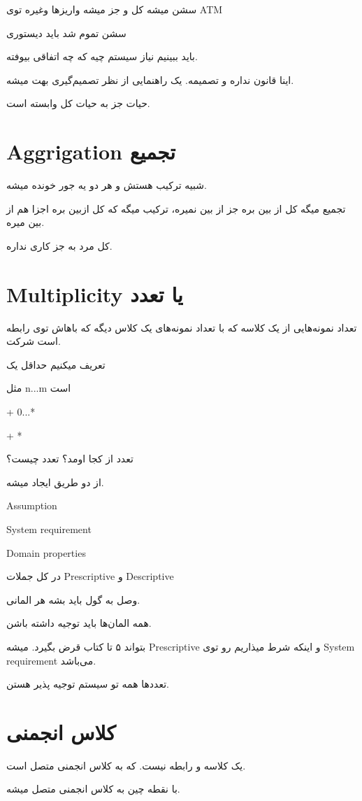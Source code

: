 سشن میشه کل و جز میشه واریزها وغیره توی ATM

سشن تموم شد باید دیستوری

باید ببینیم نیاز سیستم چیه که چه اتفاقی بیوفته.

اینا قانون نداره و تصمیمه. یک راهنمایی از نظر تصمیم‌گیری بهت میشه.

حیات جز به حیات کل وابسته است.

\section{Aggrigation تجمیع}

شبیه ترکیب هستش و هر دو یه جور خونده میشه. 

تجمیع میگه کل از بین بره جز از بین نمیره، ترکیب میگه که کل ازبین بره اجزا هم از
بین میره.

کل مرد به جز کاری نداره.

\section{Multiplicity یا تعدد }

تعداد نمونه‌هایی از یک کلاسه که با تعداد نمونه‌های یک کلاس دیگه که باهاش توی
رابطه است شرکت.

تعریف میکنیم حداقل یک

مثل n...m است

+ 0...*

+ *

تعدد از کجا اومد؟ تعدد چیست؟

از دو طریق ایجاد میشه.

Assumption

System requirement

Domain properties

در کل جملات Prescriptive و Descriptive

وصل به گول باید بشه هر المانی.

همه المان‌ها باید توجیه داشته باشن.

بتواند ۵ تا کتاب قرض بگیرد. میشه Prescriptive و اینکه شرط میذاریم رو توی System
requirement می‌باشد.

تعدد‌ها همه تو سیستم توجیه پذیر هستن.

\section{کلاس انجمنی}

یک کلاسه و رابطه نیست. که به کلاس انجمنی متصل است.

با نقطه چین به کلاس انجمنی متصل میشه.

